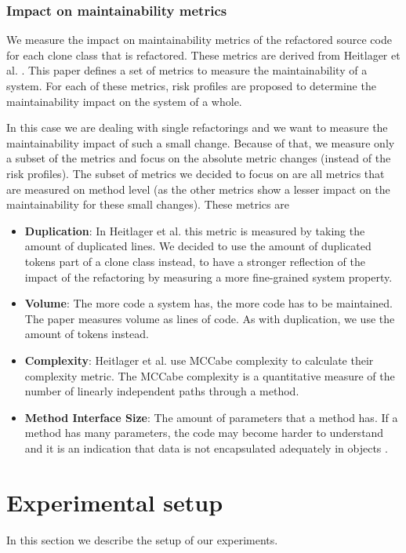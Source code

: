 \documentclass[sigconf,review, table]{acmart}
\begin{document}
\subsubsection{Impact on maintainability metrics} \label{sec:metrics}
We measure the impact on maintainability metrics of the refactored source code for each clone class that is refactored. These metrics are derived from Heitlager et al. \cite{heitlager2007practical}. This paper defines a set of metrics to measure the maintainability of a system. For each of these metrics, risk profiles are proposed to determine the maintainability impact on the system of a whole.

In this case we are dealing with single refactorings and we want to measure the maintainability impact of such a small change. Because of that, we measure only a subset of the metrics \cite{heitlager2007practical} and focus on the absolute metric changes (instead of the risk profiles). The subset of metrics we decided to focus on are all metrics that are measured on method level (as the other metrics show a lesser impact on the maintainability for these small changes). These metrics are
\begin{itemize}
\item \textbf{Duplication}: In Heitlager et al. \cite{heitlager2007practical} this metric is measured by taking the amount of duplicated lines. We decided to use the amount of duplicated tokens part of a clone class instead, to have a stronger reflection of the impact of the refactoring by measuring a more fine-grained system property.
\item \textbf{Volume}: The more code a system has, the more code has to be maintained. The paper \cite{heitlager2007practical} measures volume as lines of code. As with duplication, we use the amount of tokens instead.
\item \textbf{Complexity}: Heitlager et al. use MCCabe complexity \cite{mccabe1976complexity} to calculate their complexity metric. The MCCabe complexity is a quantitative measure of the number of linearly independent paths through a method.
\item \textbf{Method Interface Size}: The amount of parameters that a method has. If a method has many parameters, the code may become harder to understand and it is an indication that data is not encapsulated adequately in objects \cite{fowler2018refactoring}.
\end{itemize}

\section{Experimental setup}
In this section we describe the setup of our experiments.
\end{document}
